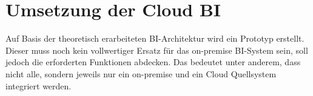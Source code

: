 \chapter{Umsetzung der Cloud BI} \label{ch:praktischeUmsetzung}
Auf Basis der theoretisch erarbeiteten BI-Architektur wird ein Prototyp erstellt. Dieser muss noch kein vollwertiger Ersatz für das on-premise BI-System sein, soll jedoch die erforderten Funktionen abdecken. Das bedeutet unter anderem, dass nicht alle, sondern jeweils nur ein on-premise und ein Cloud Quellsystem integriert werden.





